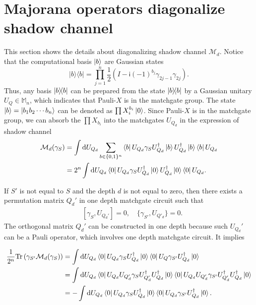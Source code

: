 \documentclass[showpacs,twocolumn,aps,prx,long bibliography,superscriptaddress,notitlepage]{revtex4-1}
\newcommand{\ii}{\mathsf{i}}
\newcommand{\tra}[1]{\text{Tr}\left( #1 \right)}
\newcommand{\Mbb}{\mathbb{M}}
\begin{document}
\section{Majorana operators diagonalize shadow channel}
\label{appendix: 1}


This section shows the details about diagonalizing shadow channel $\mathcal{M}_d$. 
Notice that the computational basis $\ket{b}$ are Gaussian states
\begin{equation}
    |b\rangle\langle b|=\prod_{j=1}^n \frac{1}{2}\left(I-\ii(-1)^{b_j} \gamma_{2 j-1} \gamma_{2 j}\right).
\end{equation}
Thus, any basis $\ketbra{b}{b}$ can be prepared from the state $\ketbra{b}{b}$ by a Gaussian unitary $U_Q\in \Mbb_n$, which indicates that Pauli-$X$ is in the matchgate group. 
The state $\ket{b}= \ket{b_1b_2\cdots b_n}$ can be denoted as $\prod X_{i}^{b_i} \ket{0}$. 
Since Pauli-$X$ is in the matchgate group, we can absorb the $\prod X_{b_i}$ into the matchgates $U_{Q_d}$ in the expression of shadow channel
\begin{align}
\mathcal{M}_d(\gamma_S) &= \int \dd U_{Q_d}\sum_{b\in\{0,1\}^n}\bra{b}U_{Q_d}\gamma_S U_{Q_d}^\dagger \ket{b} U_{Q_d}^\dagger \ket{b}\bra{b}U_{Q_d}\\
&= 2^n\int \dd U_{Q_d} \bra{0}U_{Q_d}\gamma_S U_{Q_d}^\dagger \ket{0} U_{Q_d}^\dagger \ket{0}\bra{0}U_{Q_d}.
\end{align}

If $S'$ is not equal to $ S$ and the depth $d$ is not equal to zero, 
then there exists a permutation matrix $Q_d'$ in one depth matchgate circuit such that
\begin{align}
\quad [\gamma_{S}, U_{Q_d'}] = 0, \quad \{\gamma_{S'}, U_{Q'_d}\} = 0. 
\end{align}
The orthogonal matrix $Q_d'$ can be constructed in one depth because such $U_{Q_d}'$ can be a Pauli operator, which involves one depth matchgate circuit. It implies
\begin{widetext}
    \begin{align}
\frac{1}{2^n}\tra{\gamma_{S'} \mathcal{M}_d(\gamma_S)} &= 
\int \dd U_{Q_d} \bra{0} U_{Q_d} \gamma_S U_{Q_d}^\dagger \ket{0}\bra{0}U_Q \gamma_{S'} U_{Q_d}^\dagger\ket{0}\\
&=\int \dd U_{Q_d} \bra{0}U_{Q_d} U_{Q'_d} \gamma_S U_{Q'_d}^\dagger U_{Q_d}^\dagger\ket{0}\bra{0}U_{Q_d} U_{Q'_d}\gamma_{S'} U_{Q'_d}^\dagger U_{Q_d}^\dagger\ket{0}\\
&= -\int \dd U_{Q_d} \bra{0}U_{Q_d} \gamma_S U_{Q_d}^\dagger\ket{0}\bra{0}U_{Q_d} \gamma_{S'} U_{Q_d}^\dagger\ket{0}.
\end{align}
\end{widetext}
\end{document}
